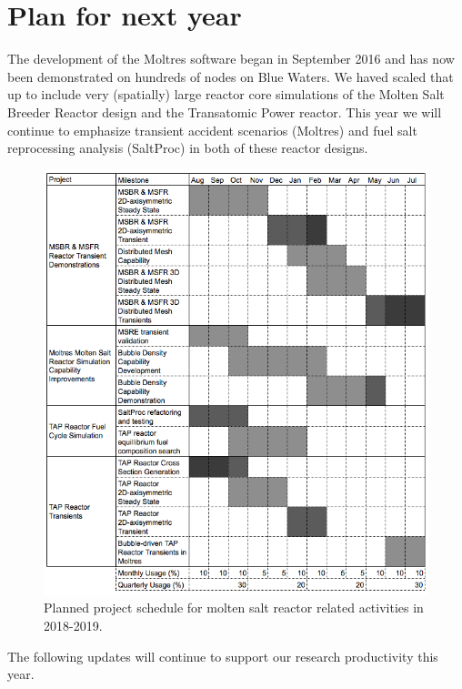 \documentclass[letterpaper]{article}
\begin{document}
\section{Plan for next year}

The development of the Moltres software  began in September 2016 and has now been
demonstrated on hundreds of nodes on Blue Waters. We haved scaled that up to
include very (spatially) large reactor core simulations of the Molten Salt 
Breeder Reactor design and the Transatomic Power reactor. This year we will 
continue to emphasize transient accident scenarios (Moltres) and fuel salt 
reprocessing analysis (SaltProc) in both of these reactor designs.

\begin{figure}[htbp!]
\begin{center}
        \includegraphics[width=\textwidth]{proj.png}
\end{center}
\caption{Planned project schedule for molten salt reactor related activities in 
2018-2019.}
\label{fig:proj}
\end{figure}

The following updates will continue to support our research 
productivity this year. 
\end{document}
